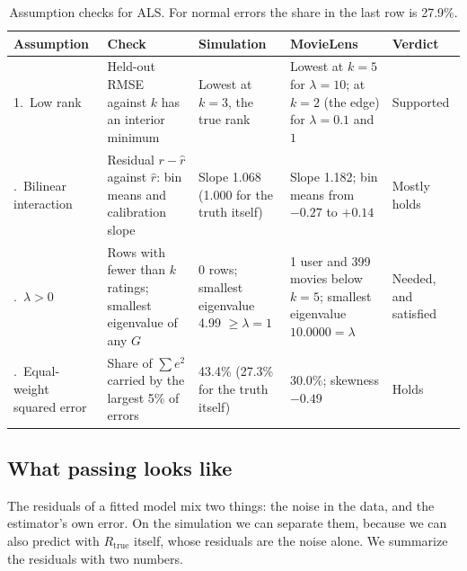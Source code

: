 \documentclass[11pt]{article}
\theoremstyle{definition}
\begin{document}
\begin{table}[htbp]
\centering
\small
\begin{tabular}{@{}>{\raggedright}p{2.3cm}>{\raggedright}p{3.3cm}>{\raggedright}p{3.4cm}>{\raggedright}p{3.8cm}>{\raggedright\arraybackslash}p{1.8cm}@{}}
\toprule
Assumption & Check & Simulation & MovieLens & Verdict \\
\midrule
1.\ Low rank & Held-out RMSE against $k$ has an interior minimum
  & Lowest at $k = 3$, the true rank & Lowest at $k = 5$ for $\lambda = 10$; at $k = 2$ (the edge)
  for $\lambda = 0.1$ and $1$ & Supported \\
\addlinespace
3.\ Bilinear interaction & Residual $r - \hat r$ against $\hat r$: bin means and calibration slope
  & Slope 1.068 (1.000 for the truth itself) & Slope 1.182; bin means from $-0.27$ to $+0.14$
  & Mostly holds \\
\addlinespace
4.\ $\lambda > 0$ & Rows with fewer than $k$ ratings; smallest eigenvalue of any $G$
  & 0 rows; smallest eigenvalue 4.99 $\ge \lambda = 1$ & 1 user and 399 movies below $k = 5$;
  smallest eigenvalue $10.0000 = \lambda$ & Needed, and satisfied \\
\addlinespace
5.\ Equal-weight squared error & Share of $\sum e^2$ carried by the largest 5\% of errors
  & 43.4\% (27.3\% for the truth itself) & 30.0\%; skewness $-0.49$ & Holds \\
\bottomrule
\end{tabular}
\caption{Assumption checks for ALS. For normal errors the share in the last row is 27.9\%.}
\label{tab:assumptions}
\end{table}

\subsection{What passing looks like}
\label{sec:passing}

The residuals of a fitted model mix two things: the noise in the data, and the estimator's own
error. On the simulation we can separate them, because we can also predict with $R_{\mathrm{true}}$
itself, whose residuals are the noise alone. We summarize the residuals with two numbers.
\end{document}
